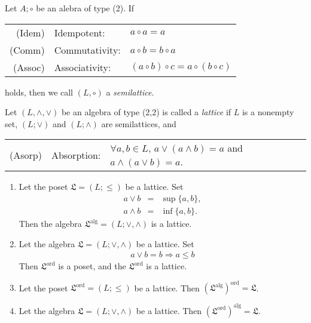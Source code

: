 \begin{definition}
    Let \(A;\circ\) be an alebra of type (2). If
    \begin{center}
        \begin{tabular}{r l l}
            (Idem) & Idempotent: & \(a \circ a = a\) \\
            (Comm) & Commutativity: & \(a \circ b = b \circ a\) \\
            (Assoc) & Associativity: & \((a\circ b) \circ c = a \circ (b \circ c)\)
        \end{tabular}
    \end{center}
    holds, then we call \((L,\circ)\) a \emph{semilattice}.
\end{definition}

\begin{definition}
    Let \((L,\wedge,\vee)\) be an algebra of type (2,2) is called a \emph{lattice} if \(L\) is a nonempty set, \((L;\vee)\) and \((L;\wedge)\) are semilattices, and
    \begin{center}
    \begin{tabular}{r l l}
        (Asorp) & Absorption: & \(\forall a,b \in L,\, a \vee (a\wedge b) = a\) and \(a\wedge (a\vee b) = a \).
    \end{tabular}
    \end{center}
\end{definition}

\begin{theorem}
    \begin{enumerate}[label=(\alph*)]
        \item Let the poset \(\mathfrak{L} =(L;\le)\) be a lattice. Set
        \begin{eqnarray*}
            a \vee b &=& \sup\{a,b\}, \\
            a \wedge b &=& \inf \{a,b\}.
        \end{eqnarray*}
        Then the algebra \(\mathfrak{L}^{\mathrm{alg}}=(L;\vee,\wedge)\) is a lattice.

        \item Let the algebra \(\mathfrak{L} = (L;\vee,\wedge) \) be a lattice. Set
        \begin{eqnarray*}
            a \vee b = b \Rightarrow a \le b
        \end{eqnarray*}
        Then \(\mathfrak{L}^{\mathrm{ord}}\) is a poset, and the \(\mathfrak{L}^{\mathrm{ord}}\) is a lattice.

        \item Let the poset \(\mathfrak{L}^{\mathrm{ord}}=(L;\le)\) be a lattice. Then \((\mathfrak{L}^{\mathrm{alg}})^{\mathrm{ord}}=\mathfrak{L}\).
        
        \item Let the algebra \(\mathfrak{L}=(L;\vee,\wedge)\) be a lattice. Then \((\mathfrak{L}^{\mathrm{ord}})^\mathrm{alg}=\mathfrak{L}\).
    \end{enumerate}
\end{theorem}